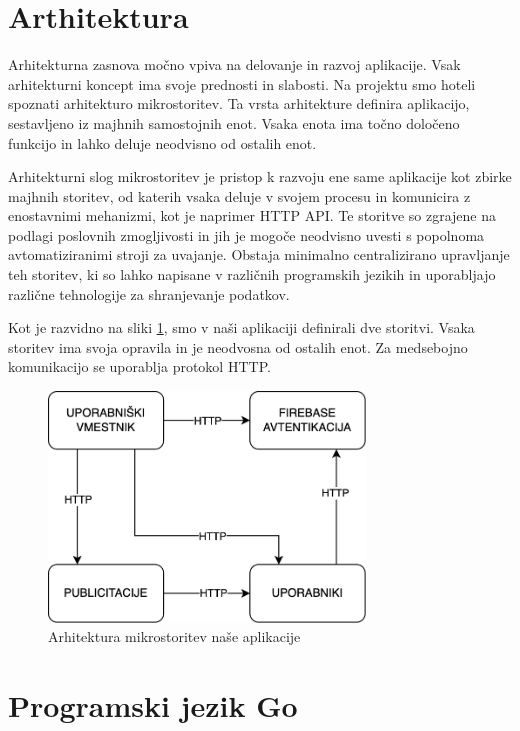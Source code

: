 \documentclass[a4paper, 12pt]{book}
\begin{document}
\section{Arthitektura}
Arhitekturna zasnova močno vpiva na delovanje in razvoj aplikacije. Vsak arhitekturni koncept ima svoje prednosti in slabosti. Na projektu smo hoteli spoznati arhitekturo mikrostoritev. Ta vrsta arhitekture definira aplikacijo, sestavljeno iz majhnih samostojnih enot. Vsaka enota ima točno določeno funkcijo in lahko deluje neodvisno od ostalih enot.

Arhitekturni slog mikrostoritev je pristop k razvoju ene same aplikacije kot zbirke majhnih storitev, od katerih vsaka deluje v svojem procesu in komunicira z enostavnimi mehanizmi, kot je naprimer HTTP API. Te storitve so zgrajene na podlagi poslovnih zmogljivosti in jih je mogoče neodvisno uvesti s popolnoma avtomatiziranimi stroji za uvajanje. Obstaja minimalno centralizirano upravljanje teh storitev, ki so lahko napisane v različnih programskih jezikih in uporabljajo različne tehnologije za shranjevanje podatkov. \cite{mfowler-microservices}

Kot je razvidno na sliki \ref{app-architecture}, smo v naši aplikaciji definirali dve storitvi. Vsaka storitev ima svoja opravila in je neodvosna od ostalih enot. Za medsebojno komunikacijo se uporablja protokol HTTP.

\begin{figure}[h]
\begin{center}
\includegraphics[width=0.75\textwidth]{slike/architecture.png}
\end{center}
\caption{ Arhitektura mikrostoritev naše aplikacije }
\label{app-architecture}
\end{figure}

\newpage
\section{Programski jezik Go}
\end{document}
